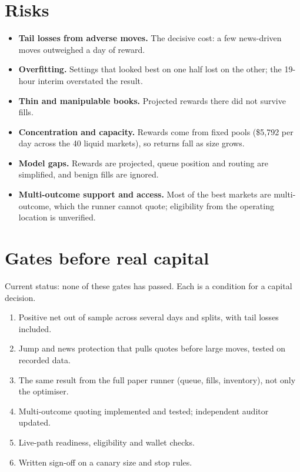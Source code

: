 \documentclass[11pt,a4paper]{article}
\begin{document}
\section{Risks}
\begin{itemize}[leftmargin=1.2em]
  \item \textbf{Tail losses from adverse moves.} The decisive cost: a few news-driven moves outweighed a day of reward.
  \item \textbf{Overfitting.} Settings that looked best on one half lost on the other; the 19-hour interim overstated the result.
  \item \textbf{Thin and manipulable books.} Projected rewards there did not survive fills.
  \item \textbf{Concentration and capacity.} Rewards come from fixed pools (\$5,792 per day across the 40 liquid markets), so returns fall as size grows.
  \item \textbf{Model gaps.} Rewards are projected, queue position and routing are simplified, and benign fills are ignored.
  \item \textbf{Multi-outcome support and access.} Most of the best markets are multi-outcome, which the runner cannot quote; eligibility from the operating location is unverified.
\end{itemize}

\section{Gates before real capital}\label{sec:gates}
\begin{warn}
Current status: none of these gates has passed. Each is a condition for a capital decision.
\end{warn}
\begin{enumerate}[leftmargin=1.5em]
  \item Positive net out of sample across several days and splits, with tail losses included.
  \item Jump and news protection that pulls quotes before large moves, tested on recorded data.
  \item The same result from the full paper runner (queue, fills, inventory), not only the optimiser.
  \item Multi-outcome quoting implemented and tested; independent auditor updated.
  \item Live-path readiness, eligibility and wallet checks.
  \item Written sign-off on a canary size and stop rules.
\end{enumerate}
\end{document}
